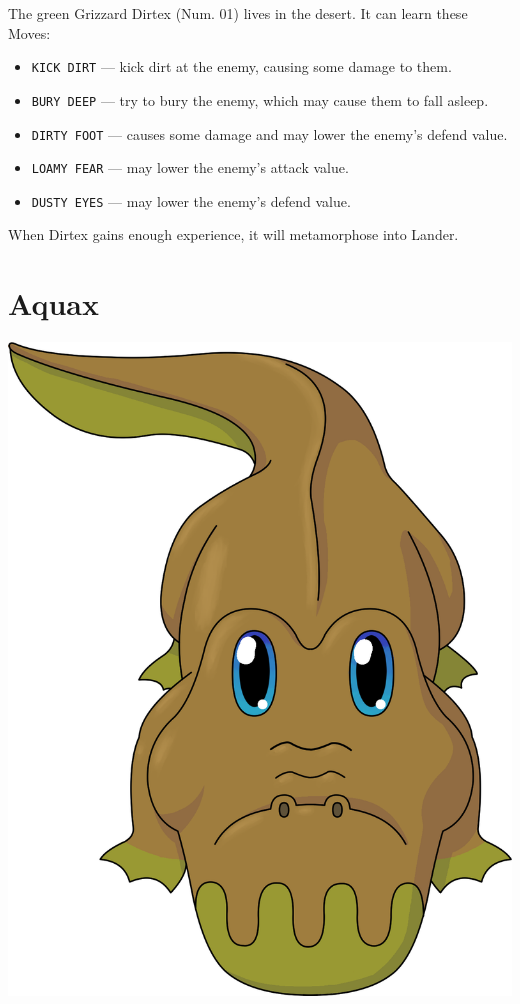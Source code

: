 \documentclass[10pt,twocolumn,openany,article]{memoir}
\begin{document}
The green  Grizzard Dirtex (Num. 01)  lives in the desert.  It can learn
these Moves:

\begin{itemize}
\item \texttt{KICK DIRT} --- kick dirt at the enemy, causing some damage
  to them.
\item \texttt{BURY DEEP} --- try to bury the enemy, which may cause them
  to fall asleep.
\item  \texttt{DIRTY FOOT}  --- causes  some  damage and  may lower  the
  enemy's defend value.
\item \texttt{LOAMY FEAR} --- may lower the enemy's attack value.
\item \texttt{DUSTY EYES} --- may lower the enemy's defend value.
\end{itemize}

When Dirtex gains enough experience, it will metamorphose into Lander.

\fi

\section{Aquax}

\begin{center}
  \includegraphics[width=.75\columnwidth]{../Manual/Aquax.png}
\end{center}
\end{document}
